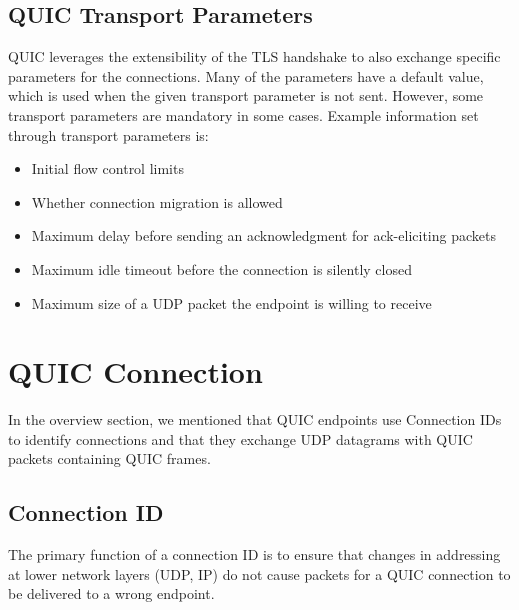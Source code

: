 \subsection{QUIC Transport Parameters}

QUIC leverages the extensibility of the TLS handshake to also exchange specific parameters for the
connections. Many of the parameters have a default value, which is used when the given transport
parameter is not sent. However, some transport parameters are mandatory in some cases. Example
information set through transport parameters is:

\begin{itemize}

  \item Initial flow control limits

  \item Whether connection migration is allowed

  \item Maximum delay before sending an acknowledgment for ack-eliciting packets

  \item Maximum idle timeout before the connection is silently closed

  \item Maximum size of a UDP packet the endpoint is willing to receive

\end{itemize}


\section{QUIC Connection}

In the overview section, we mentioned that QUIC endpoints use Connection IDs to identify connections
and that they exchange UDP datagrams with QUIC packets containing QUIC frames.

\subsection{Connection ID}



The primary function of a connection ID is to ensure that changes in addressing at lower network
layers (UDP, IP) do not cause packets for a QUIC connection to be delivered to a wrong endpoint.

